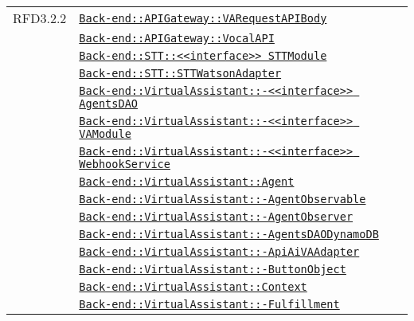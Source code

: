 \begin{longtable}{|>{\centering}m{3cm}|m{10cm}<{\centering}|}
RFD3.2.2 & \hyperref[Back-end::APIGateway::VARequestAPIBody]{\texttt{Back-end::APIGateway::VARequestAPIBody}}\\
& \hyperref[Back-end::APIGateway::VocalAPI]{\texttt{Back-end::APIGateway::VocalAPI}}\\
& \hyperref[Back-end::STT::<<interface>> STTModule]{\texttt{Back-end::STT::<<interface>> STTModule}}\\
& \hyperref[Back-end::STT::STTWatsonAdapter]{\texttt{Back-end::STT::STTWatsonAdapter}}\\
& \hyperref[Back-end::VirtualAssistant::<<interface>> AgentsDAO]{\texttt{Back-end::VirtualAssistant::-\linebreak <<interface>> AgentsDAO}}\\
& \hyperref[Back-end::VirtualAssistant::<<interface>> VAModule]{\texttt{Back-end::VirtualAssistant::-\linebreak <<interface>> VAModule}}\\
& \hyperref[Back-end::VirtualAssistant::<<interface>> WebhookService]{\texttt{Back-end::VirtualAssistant::-\linebreak <<interface>> WebhookService}}\\
& \hyperref[Back-end::VirtualAssistant::Agent]{\texttt{Back-end::VirtualAssistant::Agent}}\\
& \hyperref[Back-end::VirtualAssistant::AgentObservable]{\texttt{Back-end::VirtualAssistant::-\linebreak AgentObservable}}\\
& \hyperref[Back-end::VirtualAssistant::AgentObserver]{\texttt{Back-end::VirtualAssistant::-\linebreak AgentObserver}}\\
& \hyperref[Back-end::VirtualAssistant::AgentsDAODynamoDB]{\texttt{Back-end::VirtualAssistant::-\linebreak AgentsDAODynamoDB}}\\
& \hyperref[Back-end::VirtualAssistant::ApiAiVAAdapter]{\texttt{Back-end::VirtualAssistant::-\linebreak ApiAiVAAdapter}}\\
& \hyperref[Back-end::VirtualAssistant::ButtonObject]{\texttt{Back-end::VirtualAssistant::-\linebreak ButtonObject}}\\
& \hyperref[Back-end::VirtualAssistant::Context]{\texttt{Back-end::VirtualAssistant::Context}}\\
& \hyperref[Back-end::VirtualAssistant::Fulfillment]{\texttt{Back-end::VirtualAssistant::-\linebreak Fulfillment}}\\

\end{longtable}
